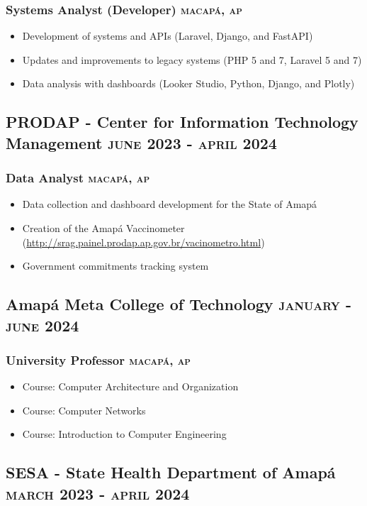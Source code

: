 \documentclass{article}
\newcommand{\rside}[1]{\hfill \normalfont\scshape\MakeLowercase{#1}}
\begin{document}
\subsubsection{Systems Analyst (Developer) \rside{Macapá, AP}}
\begin{itemize}
  \item Development of systems and APIs (Laravel, Django, and FastAPI)
  \item Updates and improvements to legacy systems (PHP 5 and 7, Laravel 5 and 7)
  \item Data analysis with dashboards (Looker Studio, Python, Django, and Plotly)
\end{itemize}

\subsection{PRODAP - Center for Information Technology Management \rside{June 2023 - April 2024}}
\subsubsection{Data Analyst \rside{Macapá, AP}}
\begin{itemize}
  \item Data collection and dashboard development for the State of Amapá
  \item Creation of the Amapá Vaccinometer (\url{http://srag.painel.prodap.ap.gov.br/vacinometro.html})
  \item Government commitments tracking system
\end{itemize}

\subsection{Amapá Meta College of Technology \rside{January - June 2024}}
\subsubsection{University Professor \rside{Macapá, AP}}
\begin{itemize}
  \item Course: Computer Architecture and Organization
  \item Course: Computer Networks
  \item Course: Introduction to Computer Engineering
\end{itemize}

\subsection{SESA - State Health Department of Amapá \rside{March 2023 - April 2024}}
\end{document}
